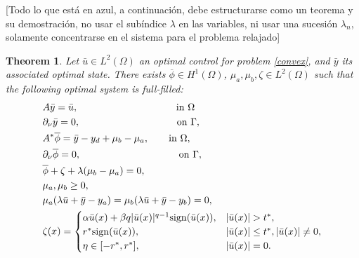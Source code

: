 \documentclass[11pt,a4paper]{amsart}
\newcommand{\sign}{\mathrm{sign}}
\newtheorem{theorem}{{Theorem}}
\begin{document}
{\color{red}[Todo lo que está en azul, a continuación,  debe estructurarse como un teorema y su demostración, no usar el subíndice $\lambda$ en las variables, ni usar una sucesión $\lambda_n$, solamente concentrarse en el sistema para el problema relajado]}
\begin{theorem}
    Let $\bar{u}\in L^{2}(\Omega)$ an optimal control for problem \eqref{convex}, and $\bar{y}$ its associated optimal state. There exists $\overline{\phi}\in H^1(\Omega)$, $\mu_a, \mu_b, \zeta\in L^2(\Omega)$ such that the following optimal system is full-filled:    \begin{equation}\label{optimality_convex}
        \begin{split}         
        &A\bar{y}=\bar{u}, \hspace{3.5cm} \mbox{in }\Omega\\
        &\partial_{\nu}\bar{y}=0, \hspace{3.45cm} \mbox{on }\Gamma,\\
        &A^*\overline{\phi}=\bar{y}-y_d+\mu_b-\mu_a, \qquad \mbox{in }\Omega,\\
        &\partial_{\nu}\overline{\phi}=0,\hspace{3.5cm}\mbox{on }\Gamma,\\        
        &\overline{\phi}+\zeta+\lambda(\mu_b-\mu_a)=0,\\
        &\mu_a, \mu_b\ge 0,\\
        &\mu_a(\lambda \bar{u}+\bar{y}-y_a)=\mu_b(\lambda \bar{u}+\bar{y}-y_b)=0,\\
        &\zeta(x)=\begin{cases}
            \alpha \bar{u}(x)+\beta q |\bar{u}(x)|^{q-1}\sign(\bar{u}(x)), &|\bar{u}(x)|>t^*,\\
            r^*\sign(\bar{u}(x)), &|\bar{u}(x)|\le t^*, |\bar{u}(x)|\ne 0,\\
            \eta \in [-r^*,r^*],& |\bar{u}(x)|=0.
        \end{cases}  
        \end{split}
    \end{equation}    
\end{theorem}
\end{document}
